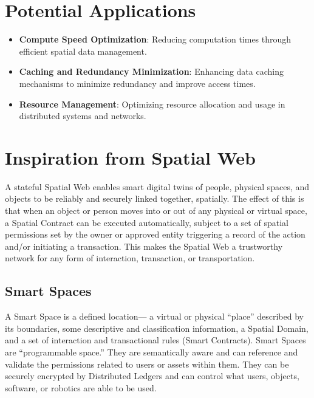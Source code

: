 \documentclass[10pt,a4paper]{article}
\begin{document}
\begin{multicols}{2}
    \section*{Potential Applications}
    \begin{itemize}
        \item \textbf{Compute Speed Optimization}: Reducing computation times through efficient spatial data management.
        \item \textbf{Caching and Redundancy Minimization}: Enhancing data caching mechanisms to minimize redundancy and improve access times.
        \item \textbf{Resource Management}: Optimizing resource allocation and usage in distributed systems and networks.
    \end{itemize}

    \section*{Inspiration from Spatial Web}
    A stateful Spatial Web enables smart digital twins of people, physical spaces, and objects to be reliably and securely linked together, spatially. The effect of this is that when an object or person moves into or out of any physical or virtual space, a Spatial Contract can be executed automatically, subject to a set of spatial permissions set by the owner or approved entity triggering a record of the action and/or initiating a transaction. This makes the Spatial Web a trustworthy network for any form of interaction, transaction, or transportation. 

    \subsection*{Smart Spaces}
    A Smart Space is a defined location— a virtual or physical “place” described by its boundaries, some descriptive and classification information, a Spatial Domain, and a set of interaction and transactional rules (Smart Contracts). Smart Spaces are “programmable space.” They are semantically aware and can reference and validate the permissions related to users or assets within them. They can be securely encrypted by Distributed Ledgers and can control what users, objects, software, or robotics are able to be used.


\end{multicols}
\end{document}
